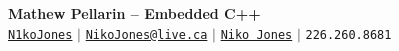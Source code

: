 \begin{center}
    \textbf{\Huge Mathew Pellarin -- Embedded C++} \\ \vspace{5pt}
    \hspace{1pt} \faGithub \hspace{2pt} \href{https://github.com/N1koJones}{\texttt{N1koJones}} \hspace{1pt} $|$
    \hspace{1pt} \faEnvelope \hspace{2pt} \href{mailto::nikojones@live.ca}{\texttt{NikoJones@live.ca}} \hspace{1pt} $|$
    \hspace{1pt} \faLinkedin \hspace{2pt} \href{https://www.linkedin.com/in/n1ko-jones/}{\texttt{Niko Jones}} \hspace{1pt} $|$
    \small \faPhone* \texttt{226.260.8681}
    \\ \vspace{-3pt}
  \end{center}